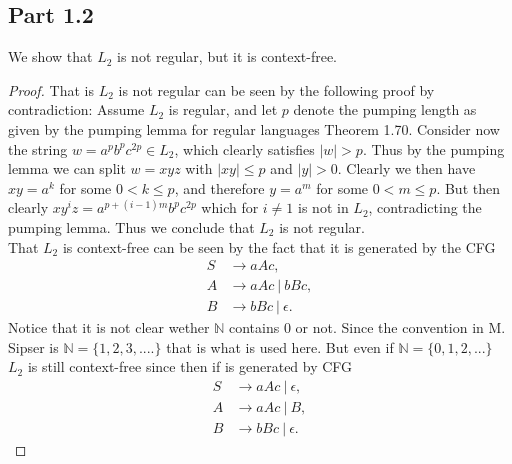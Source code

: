 \documentclass[a4paper,11pt]{article}
\newcommand{\abs}[1]{\left\lvert #1 \right\rvert}
\newcommand{\N}{\mathbb{N}}
\newcommand{\pipe}{\ \vert \ }
\numberwithin{equation}{section}
\begin{document}
	\subsection*{Part 1.2}
	We show that $ L_2 $ is not regular, but it is context-free.
	\begin{proof}
		That is $ L_2 $ is not regular can be seen by the following proof by contradiction: Assume $ L_2 $ is regular, and let $ p $ denote the pumping length as given by the pumping lemma for regular languages Theorem 1.70. Consider now the string $ w=a^pb^pc^{2p}\in L_2 $, which clearly satisfies $ \abs{w}>p $. Thus by the pumping lemma we can split $ w=xyz $ with $ \abs{xy}\leq p $ and $ \abs{y}>0 $. Clearly we then have $ xy=a^k $ for some $ 0<k\leq p $, and therefore $ y=a^m $ for some $ 0<m\leq p $. But then clearly $ xy^iz=a^{p+(i-1)m}b^pc^{2p} $ which for $ i\neq 1 $ is not in $ L_2 $, contradicting the pumping lemma. Thus we conclude that $ L_2 $ is not regular. \\
		That $ L_2 $ is context-free can be seen by the fact that it is generated by the CFG\begin{equation*}
			\begin{aligned}
			S&\to aAc,\\
			A&\to aAc\pipe bBc,\\
			B&\to bBc\pipe\epsilon.
			\end{aligned}
		\end{equation*}
		Notice that it is not clear wether $ \N $ contains $ 0 $ or not. Since the convention in M. Sipser is $ \N=\{1,2,3,....\} $ that is what is used here. But even if $ \N=\{0,1,2,...\} $ $ L_2 $ is still context-free since then if is generated by CFG
		\begin{equation*}
		\begin{aligned}
		S&\to aAc\pipe\epsilon,\\
		A&\to aAc\pipe B,\\
		B&\to bBc\pipe\epsilon.
		\end{aligned}
		\end{equation*}
	\end{proof}
	
\end{document}

